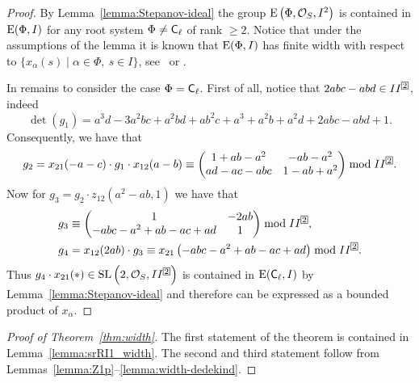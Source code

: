 \begin{proof}
By Lemma~\ref{lemma:Stepanov-ideal} the group $\operatorname{E}\left(\Phi,\mathcal{O}_S,I^2\right)$ is contained in $\operatorname{E}(\Phi,I)$ for any root system $\Phi\neq\mathsf{C}_\ell$ of rank $\geqslant2$.
Notice that under the assumptions of the lemma it is known that $\operatorname{E}(\Phi,I)$ has finite width with respect to $\{x_\alpha(s)\mid\alpha\in\Phi,\ s\in I\}$, see~\cite{Tavgen93} or \cite[Theorem~3.3]{TavgenThesis}.

In remains to consider the case $\Phi=\mathsf{C}_\ell$. First of all, notice that $2abc-abd\in II^{\indexbox{2}}$, indeed
\[ \det(g_1)=a^3d-3a^2bc+a^2bd+ab^2c+a^3+a^2b+a^2d+2abc-abd+1. \]
Consequently, we have that
\[ g_2=x_{21}(-a-c)\cdot g_1\cdot x_{12}(a-b)\equiv
\begin{pmatrix}
1+ab-a^2 & -ab-a^2 \\ ad-ac-abc & 1-ab+a^2
\end{pmatrix}\bmod II^{\indexbox{2}}. \]
Now for $g_3=g_2\cdot z_{12}\left(a^2-ab,1\right)$ we have that
\begin{align*}
& g_3\equiv\begin{pmatrix} 1 & -2ab \\ -abc-a^2+ab-ac+ad & 1 \end{pmatrix}\bmod II^{\indexbox{2}},\\
& g_4=x_{12}(2ab)\cdot g_3\equiv x_{21}\left(-abc-a^2+ab-ac+ad\right)\bmod II^{\indexbox{2}}.
\end{align*}
Thus $g_4\cdot x_{21}(*)\in\SL\left(2,\mathcal{O}_S,II^{\indexbox{2}}\right)$ is contained in $\operatorname{E}(\mathsf{C}_\ell,I)$ by Lemma~\ref{lemma:Stepanov-ideal} and therefore can be expressed as a bounded product of $x_\alpha$.
\end{proof}

\begin{proof}[Proof of Theorem~\ref{thm:width}] The first statement of the theorem is contained in Lemma~\ref{lemma:srRI1_width}.
The second and third statement follow from Lemmas~\ref{lemma:Z1p}--\ref{lemma:width-dedekind}. \end{proof}
